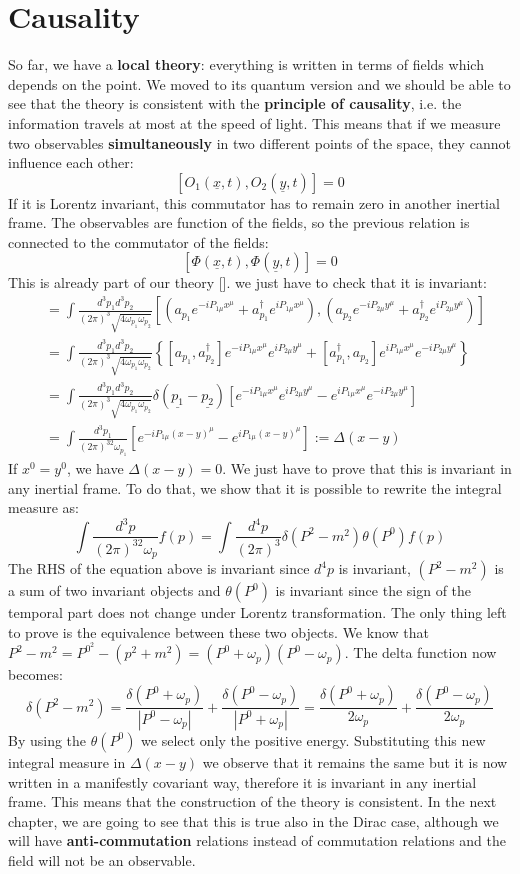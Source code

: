 \documentclass[../main.tex]{subfiles}
\begin{document}
\section{Causality}
So far, we have a \textbf{local theory}: everything is written in terms of fields which depends on the point. We moved to its quantum version and we should be able to see that the theory is consistent with the \textbf{principle of causality}, i.e. the information travels at most at the speed of light. This means that if we measure two observables \textbf{simultaneously} in two different points of the space, they cannot influence each other:
\[
[O_1(\underline{x},t),O_2(\underline{y},t)]=0
\]
If it is Lorentz invariant, this commutator has to remain zero in another inertial frame. The observables are function of the fields, so the previous relation is connected to the commutator of the fields:
\[
[\Phi(\underline{x},t),\Phi(\underline{y},t)]=0
\]
This is already part of our theory []. we just have to check that it is invariant:
\begin{align*}
[\Phi(x),\Phi(y)]&=\int\frac{d^3p_1d^3p_2}{(2\pi)^3\sqrt{4\omega_{p_1}\omega_{p_2}}}\left[(a_{p_1}e^{-iP_{1\mu}x^\mu}+a^\dagger_{p_1}e^{iP_{1\mu}x^\mu}),(a_{p_2}e^{-iP_{2\mu}y^\mu}+a^\dagger_{p_2}e^{iP_{2\mu}y^\mu})\right]\\
&=\int\frac{d^3p_1d^3p_2}{(2\pi)^3\sqrt{4\omega_{p_1}\omega_{p_2}}}\left\{[a_{p_1},a^\dagger_{p_2}]e^{-iP_{1\mu}x^\mu}e^{iP_{2\mu}y^\mu}+[a_{p_1}^\dagger,a_{p_2}]e^{iP_{1\mu}x^\mu}e^{-iP_{2\mu}y^\mu}\right\}\\
&=\int\frac{d^3p_1d^3p_2}{(2\pi)^3\sqrt{4\omega_{p_1}\omega_{p_2}}}\delta(\underline{p_1}-\underline{p_2})[e^{-iP_{1\mu}x^\mu}e^{iP_{2\mu}y^\mu}-e^{iP_{1\mu}x^\mu}e^{-iP_{2\mu}y^\mu}]\\
&=\int\frac{d^3p_1}{(2\pi)^32\omega_{p_1}}[e^{-iP_{1\mu}(x-y)^\mu}-e^{iP_{1\mu}(x-y)^\mu}]:=\Delta(x-y)
\end{align*}
If $x^0=y^0$, we have $\Delta(x-y)=0$. We just have to prove that this is invariant in any inertial frame. To do that, we show that it is possible to rewrite the integral measure as:
\[
\int\frac{d^3p}{(2\pi)^32\omega_p}f(p)=\int\frac{d^4p}{(2\pi)^3}\delta(P^2-m^2)\theta(P^0)f(p)
\]
The RHS of the equation above is invariant since $d^4p$ is invariant, $(P^2-m^2)$ is a sum of two invariant objects and $\theta(P^0)$ is invariant since the sign of the temporal part does not change under Lorentz transformation. The only thing left to prove is the equivalence between these two objects. We know that $P^2-m^2=P^0^2-(p^2+m^2)=(P^0+\omega_p)(P^0-\omega_p)$. The delta function now becomes:
\[
\delta(P^2-m^2)=\frac{\delta(P^0+\omega_p)}{|P^0-\omega_p|}+\frac{\delta(P^0-\omega_p)}{|P^0+\omega_p|}=\frac{\delta(P^0+\omega_p)}{2\omega_p}+\frac{\delta(P^0-\omega_p)}{2\omega_p}
\]
By using the $\theta(P^0)$ we select only the positive energy. Substituting this new integral measure in $\Delta(x-y)$ we observe that it remains the same but it is now written in a manifestly covariant way, therefore it is invariant in any inertial frame. This means that the construction of the theory is consistent. In the next chapter, we are going to see that this is true also in the Dirac case, although we will have \textbf{anti-commutation} relations instead of commutation relations and the field will not be an observable.
\end{document}
